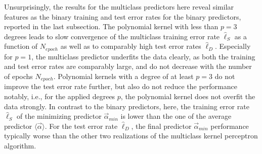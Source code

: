 Unsurprisingly, the results for the multiclass predictors here reveal similar features as the binary training and test error rates for the binary predictors, reported in the last subsection. The polynomial kernel with less than $p = 3$ degrees leads to slow convergence of the multiclass training error rate $\hat{\ell}_S$ as a function of $N_{epoch}$ as well as to comparably high test error rates $\hat{\ell}_D$. Especially for $p=1$, the multiclass predictor underfits the data clearly, as both the training and test error rates are comparably large, and do not decrease with the number of epochs $N_{epoch}$. Polynomial kernels with a degree of at least $p=3$ do not improve the test error rate further, but also do not reduce the performance notably, i.e., for the applied degrees $p$, the polynomial kernel does not overfit the data strongly. In contrast to the binary predictors, here, the training error rate $\hat{\ell}_S$ of the minimizing predictor $\vec{\alpha}_{min}$ is lower than the one of the average predictor $\langle\vec{\alpha}\rangle$. For the test error rate $\hat{\ell}_D$, the final predictor $\vec{\alpha}_{min}$ performance typically worse than the other two realizations of the multiclass kernel perceptron algorithm.

